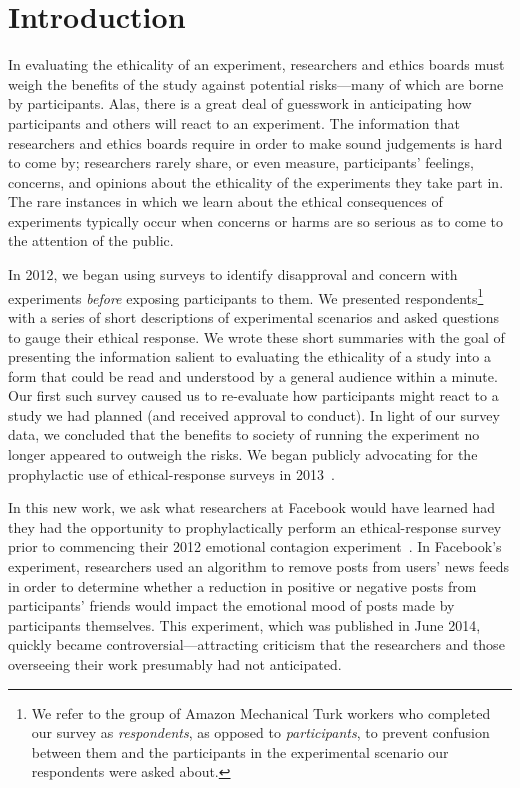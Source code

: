 \section{Introduction}
In evaluating the ethicality of an experiment, researchers and ethics boards must weigh the benefits of the study against potential risks---many of which are borne by participants.  Alas, there is a great deal of guesswork in anticipating how participants and others will react to an experiment.  The information that researchers and ethics boards require in order to make sound judgements is hard to come by; researchers rarely share, or even measure, participants' feelings, concerns, and opinions about the ethicality of the experiments they take part in.  The rare instances in which we learn about the ethical consequences of experiments typically occur when concerns or harms are so serious as to come to the attention of the public.

In 2012, we began using surveys to identify disapproval and concern with experiments \emph{before} exposing participants to them.  We presented respondents\footnote{We refer to the group of Amazon Mechanical Turk workers who completed our survey as \emph{respondents}, as opposed to \emph{participants}, to prevent confusion between them and the participants in the experimental scenario our respondents were asked about.} with a series of short descriptions of experimental scenarios and asked questions to gauge their ethical response.  We wrote these short summaries with the goal of presenting the information salient to evaluating the ethicality of a study into a form that could be read and understood by a general audience within a minute.  Our first such survey caused us to re-evaluate how participants might react to a study we had planned (and received approval to conduct).  In light of our survey data, we concluded that the benefits to society of running the experiment no longer appeared to outweigh the risks.  We began publicly advocating for the prophylactic use of ethical-response surveys in 2013~\cite{BravoLillo2013:CREDS}.

In this new work, we ask what researchers at Facebook would have learned had they had the opportunity to prophylactically perform an ethical-response survey prior to commencing their 2012 emotional contagion experiment~\cite{Kramer2014:SocialContagion}.  In Facebook's experiment, researchers used an algorithm to remove posts from users' news feeds in order to determine whether a reduction in positive or negative posts from participants' friends would impact the emotional mood of posts made by participants themselves.  This experiment, which was published in June 2014, quickly became controversial---attracting criticism that the researchers and those overseeing their work presumably had not anticipated.

